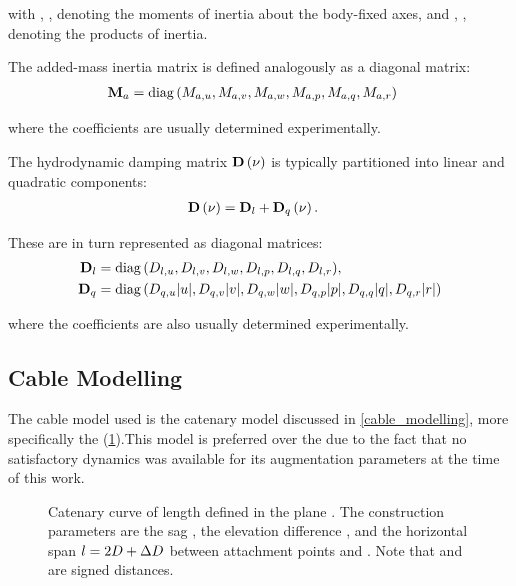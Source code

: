 with , ,  denoting the moments of inertia about the
body-fixed axes, and , ,  denoting the products of
inertia.

The added-mass inertia matrix  is defined analogously as a diagonal matrix:
\begin{align}
	\lrdmatr{M}{a} & = \diag{\left(\ldscal{M}{a, u}, \ldscal{M}{a, v}, \ldscal{M}{a, w}, \ldscal{M}{a, p}, \ldscal{M}{a, q}, \ldscal{M}{a, r}\right)}
\end{align}

where the coefficients are usually determined experimentally.

The hydrodynamic damping matrix $\matr{D}\left(\vect{\nu}\right)$ is typically partitioned into
linear and quadratic components:
\begin{align}
	\matr{D}\left(\vect{\nu}\right) & = \lrdmatr{D}{l} + \lrdmatr{D}{q}\left(\vect{\nu}\right).
\end{align}

These are in turn represented as diagonal matrices:
\begin{align}
	\lrdmatr{D}{l} & = \diag{\left( \ldscal{D}{l,u}, \ldscal{D}{l,v}, \ldscal{D}{l,w}, \ldscal{D}{l,p}, \ldscal{D}{l,q}, \ldscal{D}{l,r} \right)},                                          \\
	\lrdmatr{D}{q} & = \diag{\left( \ldscal{D}{q,u}\abs{u}, \ldscal{D}{q,v}\abs{v}, \ldscal{D}{q,w}\abs{w}, \ldscal{D}{q,p}\abs{p}, \ldscal{D}{q,q}\abs{q}, \ldscal{D}{q,r}\abs{r} \right)}
\end{align}

where the coefficients are also usually determined experimentally.

\subsection{Cable Modelling}
\label{rcc_rcm_cable_modelling}

The cable model used is the catenary model discussed in \cref{cable_modelling}, more specifically
the \verticalmodel{} (\cref{rcc_rcm_cm_d_catenary_curve}).This model is preferred over the
\augmentedmodel{} due to the fact that no satisfactory dynamics was available for its augmentation
parameters at the time of this work.
\begin{figure}
	\centering
	\caption{
		Catenary curve of length \catL{} defined in the plane . The construction parameters are
		the sag \catH{}, the elevation difference \catdH{}, and the horizontal span $l = 2D + \Delta D$
		between attachment points  and . Note that \catdD{} and \catdH{} are
		signed distances.
	}
	\label{rcc_rcm_cm_d_catenary_curve}
\end{figure}

